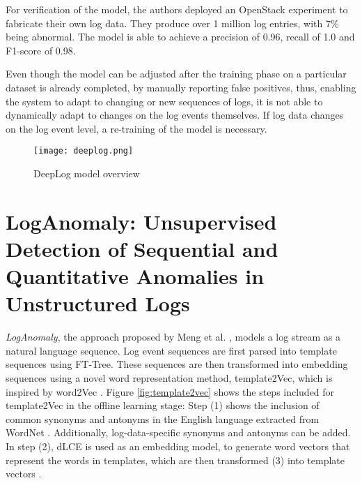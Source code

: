 For verification of the model, the authors deployed an OpenStack experiment to fabricate their own log data. They produce over 1 million log entries, with 7\% being abnormal. The model is able to achieve a precision of 0.96, recall of 1.0 and F1-score of 0.98.

Even though the model can be adjusted after the training phase on a particular dataset is already completed, by manually reporting false positives, thus, enabling the system to adapt to changing or new sequences of logs, it is not able to dynamically adapt to changes on the log events themselves. If log data changes on the log event level, a re-training of the model is necessary.
\clearpage
\begin{figure}[h]
  \centering
  \texttt{[image: deeplog.png]}\\
  \caption{DeepLog model overview \cite{graves2013speech}}
  \label{fig:deeplog}
\end{figure}


\section{LogAnomaly: Unsupervised Detection of Sequential and Quantitative Anomalies in Unstructured Logs \label{sec:loganomaly}}
\textit{LogAnomaly}, the approach proposed by Meng et al. \cite{meng2019loganomaly}, models a log stream as a natural language sequence. Log event sequences are first parsed into template sequences using FT-Tree. These sequences are then transformed into embedding sequences using a novel word representation method, template2Vec, which is inspired by word2Vec \cite{mikolov2013distributed}. Figure \ref{fig:template2vec} shows the steps included for template2Vec in the offline learning stage: Step (1) shows the inclusion of common synonyms and antonyms in the English language extracted from WordNet \cite{miller1995wordnet}. Additionally, log-data-specific synonyms and antonyms can be added. In step (2), dLCE \cite{nguyen2016integrating} is used as an embedding model, to generate word vectors that represent the words in templates, which are then transformed (3) into template vectors \cite{meng2019loganomaly}.

